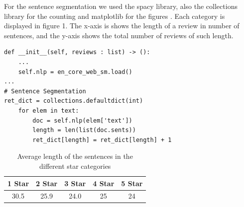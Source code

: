 For the sentence segmentation we used the spacy library, also the collections library for the counting and matplotlib for the figures . Each category is displayed in figure 1. The x-axis is shows the length of a review in number of sentences, and the y-axis shows the total number of reviews of such length.\\
\begin{Verbatim}
def __init__(self, reviews : list) -> ():
	...
	self.nlp = en_core_web_sm.load()
...
# Sentence Segmentation
ret_dict = collections.defaultdict(int)
	for elem in text:
		doc = self.nlp(elem['text'])
		length = len(list(doc.sents))
		ret_dict[length] = ret_dict[length] + 1
\end{Verbatim}
	\begin{center}
		\begin{table}[!h]
			\caption{Average length of the sentences in the different star categories}
			\begin{tabular}{c | c | c | c | c}
				1 Star & 2 Star & 3 Star  & 4 Star & 5 Star\\\hline
				30.5 & 25.9 & 24.0  & 25 & 24\\
			\end{tabular}
		\end{table}
	\end{center}
	
